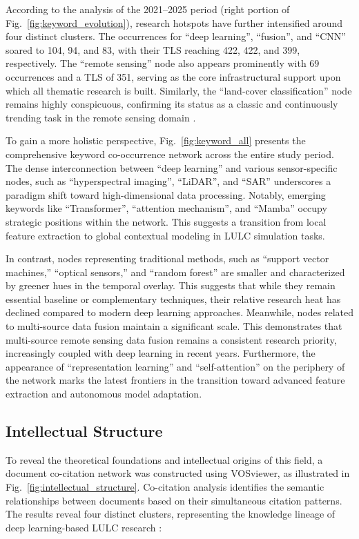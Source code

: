 \documentclass[]{interact}
\theoremstyle{plain}%
\theoremstyle{definition}
\theoremstyle{remark}
\begin{document}
According to the analysis of the 2021--2025 period (right portion of Fig.~\ref{fig:keyword_evolution}), research hotspots have further intensified around four distinct clusters. The occurrences for ``deep learning'', ``fusion'', and ``CNN'' soared to 104, 94, and 83, with their TLS reaching 422, 422, and 399, respectively. The ``remote sensing'' node also appears prominently with 69 occurrences and a TLS of 351, serving as the core infrastructural support upon which all thematic research is built. Similarly, the ``land-cover classification'' node remains highly conspicuous, confirming its status as a classic and continuously trending task in the remote sensing domain \citep{cao2020urban}.

To gain a more holistic perspective, Fig.~\ref{fig:keyword_all} presents the comprehensive keyword co-occurrence network across the entire study period. The dense interconnection between ``deep learning'' and various sensor-specific nodes, such as ``hyperspectral imaging'', ``LiDAR'', and ``SAR'' underscores a paradigm shift toward high-dimensional data processing. Notably, emerging keywords like ``Transformer'', ``attention mechanism'', and ``Mamba'' occupy strategic positions within the network. This suggests a transition from local feature extraction to global contextual modeling in LULC simulation tasks.

In contrast, nodes representing traditional methods, such as ``support vector machines,'' ``optical sensors,'' and ``random forest'' \citep{belgiu2016random} are smaller and characterized by greener hues in the temporal overlay. This suggests that while they remain essential baseline or complementary techniques, their relative research heat has declined compared to modern deep learning approaches. Meanwhile, nodes related to multi-source data fusion maintain a significant scale. This demonstrates that multi-source remote sensing data fusion remains a consistent research priority, increasingly coupled with deep learning in recent years. Furthermore, the appearance of ``representation learning'' and ``self-attention'' on the periphery of the network marks the latest frontiers in the transition toward advanced feature extraction and autonomous model adaptation.

\subsection{Intellectual Structure}
To reveal the theoretical foundations and intellectual origins of this field, a document co-citation network was constructed using VOSviewer, as illustrated in Fig.~\ref{fig:intellectual_structure}. Co-citation analysis identifies the semantic relationships between documents based on their simultaneous citation patterns. The results reveal four distinct clusters, representing the knowledge lineage of deep learning-based LULC research \citep{19}:
\end{document}

